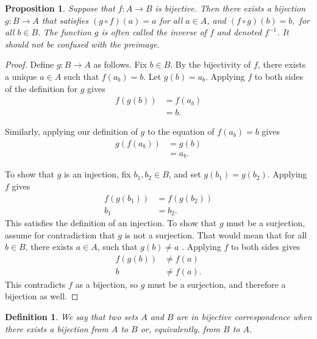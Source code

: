 \documentclass{amsart}
\newtheorem{proposition}[theorem]{Proposition}
\newtheorem{definition}[theorem]{Definition}
\newcommand{\1}{\mathds{1}}
\numberwithin{equation}{section}
\numberwithin{theorem}{section}
\begin{document}
\begin{proposition} 
Suppose that $f \colon A \rightarrow B$ is bijective.  
Then there exists a bijection $g \colon B \rightarrow A$ that satisfies $(g\circ f)(a)=a$ for all $a\in A$, and $(f\circ g)(b)=b,$ for all $b\in B.$ 
The function $g$ is often called the \emph{inverse} of $f$ and  denoted $f^{-1}$. It should not be confused with the preimage. 

\end{proposition}

\begin{proof}
	Define $g:B\to A$ as follows. Fix $b\in B$. By the bijectivity of $f$, there exists a unique $a\in A$ such that $f(a_b)=b$. Let $g(b) = a_b$. Applying $f$ to both sides of the definition for $g$ gives
	\[
	\begin{split}
		f(g(b))&=f(a_b)\\
		&=b.
	\end{split}
	\]
	
	Similarly, applying our definition of $g$ to the equation of $f(a_b)= b$ gives
	\[\begin{split}
		g(f(a_b))&=g(b)\\
		&=a_b.
	\end{split}\]
	
	To show that $g$ is an injection, fix $b_1,b_2\in B$, and set $g(b_1) = g(b_2)$. Applying $f$ gives
	\[\begin{split}
		f(g(b_1))&=f(g(b_2))\\
		b_1&=b_2.
	\end{split}\]
	This satisfies the definition of an injection. To show that $g$ must be a surjection, assume for contradiction that $g$ is not a surjection. That would mean that for all $b\in B$, there exists $a\in A$, such that $g(b)\not=a$ . Applying $f$ to both sides gives
	\[\begin{split}
		f(g(b))&\not=f(a)\\
		b&\not=f(a).
	\end{split}\]
	This contradicts $f$ as a bijection, so $g$ must be a surjection, and therefore a bijection as well.
	
\end{proof}


\begin{definition}
We say that two sets $A$ and $B$ are in \emph{bijective correspondence} when there exists a bijection from $A$ to $B$ or, equivalently, from $B$ to $A$.
\end{definition}
\end{document}
